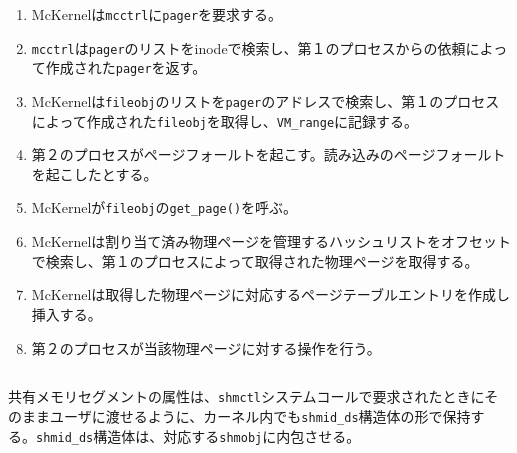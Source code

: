 \documentclass[twoside,11pt,fleqn]{book}
\begin{document}
\begin{enumerate}
\item McKernelは\texttt{mcctrl}に\texttt{pager}を要求する。
\item \texttt{mcctrl}は\texttt{pager}のリストをinodeで検索し、第１のプロセスからの依頼によって作成された\texttt{pager}を返す。
\item McKernelは\texttt{fileobj}のリストを\texttt{pager}のアドレスで検索し、第１のプロセスによって作成された\texttt{fileobj}を取得し、\texttt{VM\_range}に記録する。
\item 第２のプロセスがページフォールトを起こす。読み込みのページフォールトを起こしたとする。
\item McKernelが\texttt{fileobj}の\texttt{get\_page()}を呼ぶ。
\item McKernelは割り当て済み物理ページを管理するハッシュリストをオフセットで検索し、第１のプロセスによって取得された物理ページを取得する。
\item McKernelは取得した物理ページに対応するページテーブルエントリを作成し挿入する。
\item 第２のプロセスが当該物理ページに対する操作を行う。
\end{enumerate}

\subsection{}

\subsection{}

共有メモリセグメントの属性は、\texttt{shmctl}システムコールで要求されたときにそのままユーザに渡せるように、カーネル内でも\texttt{shmid\_ds}構造体の形で保持する。\texttt{shmid\_ds}構造体は、対応する\texttt{shmobj}に内包させる。
\end{document}
